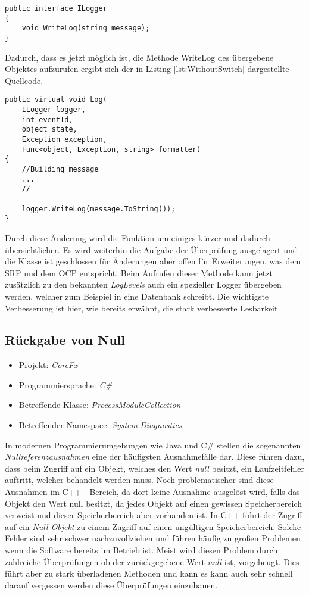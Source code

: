 \begin{lstlisting}[language={[Sharp]C}, caption=Beispiele für ein Log Interface, label=lst:LogInterface]
public interface ILogger
{
	void WriteLog(string message);
}
\end{lstlisting}

\SuperPar Dadurch, dass es jetzt möglich ist, die Methode WriteLog des übergebene Objektes aufzurufen ergibt sich der in Listing \ref{lst:WithoutSwitch} dargestellte Quellcode.

\begin{lstlisting}[language={[Sharp]C}, caption=Beispiele für Switch Statement; label=lst:SwitchStatement]
public virtual void Log(
	ILogger logger,
	int eventId,
	object state,
	Exception exception,
	Func<object, Exception, string> formatter)
{
	//Building message
	...
	//

	logger.WriteLog(message.ToString());
}
\end{lstlisting}

\SuperPar Durch diese Änderung wird die Funktion um einiges kürzer und dadurch übersichtlicher. Es wird weiterhin die Aufgabe der Überprüfung ausgelagert und die Klasse ist geschlossen für Änderungen aber offen für Erweiterungen, was dem SRP und dem OCP entspricht. Beim Aufrufen dieser Methode kann jetzt zusätzlich zu den bekannten \textit{LogLevels} auch ein spezieller Logger übergeben werden, welcher zum Beispiel in eine Datenbank schreibt. Die wichtigste Verbesserung ist hier, wie bereits erwähnt, die stark verbesserte Lesbarkeit. 

\subsection{Rückgabe von Null}
\begin{itemize}
	\item Projekt: \textit{CoreFx}
	\item Programmiersprache: \textit{C\#}
	\item Betreffende Klasse: \textit{ProcessModuleCollection}
	\item Betreffender Namespace: \textit{System.Diagnostics}
\end{itemize}

\SuperPar In modernen Programmierumgebungen wie Java und C\# stellen die sogenannten \textit{Nullreferenzausnahmen} eine der häufigsten Ausnahmefälle dar. Diese führen dazu, dass beim Zugriff auf ein Objekt, welches den Wert \textit{null} besitzt, ein Laufzeitfehler auftritt, welcher behandelt werden muss. Noch problematischer sind diese Ausnahmen im C++ - Bereich, da dort keine Ausnahme ausgelöst wird, falls das Objekt den Wert null besitzt, da jedes Objekt auf einen gewissen Speicherbereich verweist und dieser Speicherbereich aber vorhanden ist. In C++ führt der Zugriff auf ein \textit{Null-Objekt} zu einem Zugriff auf einen ungültigen Speicherbereich. Solche Fehler sind sehr schwer nachzuvollziehen und führen häufig zu großen Problemen wenn die Software bereits im Betrieb ist. Meist wird diesen Problem durch zahlreiche Überprüfungen ob der zurückgegebene Wert \textit{null} ist, vorgebeugt. Dies führt aber zu stark überladenen Methoden und kann es kann auch sehr schnell darauf vergessen werden diese Überprüfungen einzubauen.

